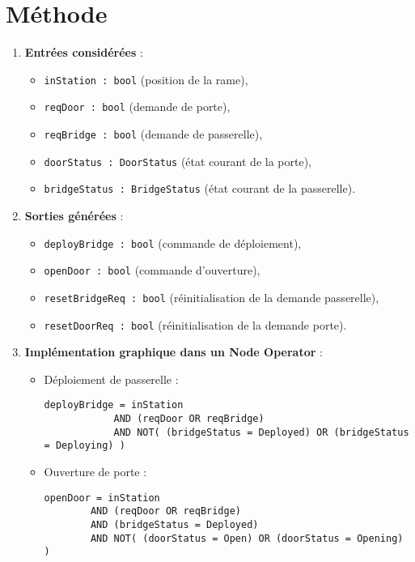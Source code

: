 \documentclass[11pt,a4paper]{report}
\begin{document}
\section*{Méthode}
\begin{enumerate}
  \item \textbf{Entrées considérées} :
  \begin{itemize}
    \item \texttt{inStation : bool} (position de la rame),
    \item \texttt{reqDoor : bool} (demande de porte),
    \item \texttt{reqBridge : bool} (demande de passerelle),
    \item \texttt{doorStatus : DoorStatus} (état courant de la porte),
    \item \texttt{bridgeStatus : BridgeStatus} (état courant de la passerelle).
  \end{itemize}

  \item \textbf{Sorties générées} :
  \begin{itemize}
    \item \texttt{deployBridge : bool} (commande de déploiement),
    \item \texttt{openDoor : bool} (commande d’ouverture),
    \item \texttt{resetBridgeReq : bool} (réinitialisation de la demande passerelle),
    \item \texttt{resetDoorReq : bool} (réinitialisation de la demande porte).
  \end{itemize}

  \item \textbf{Implémentation graphique dans un Node Operator} :
  \begin{itemize}
    \item Déploiement de passerelle :
\begin{lstlisting}
deployBridge = inStation
            AND (reqDoor OR reqBridge)
            AND NOT( (bridgeStatus = Deployed) OR (bridgeStatus = Deploying) )
\end{lstlisting}

    \item Ouverture de porte :
\begin{lstlisting}
openDoor = inStation
        AND (reqDoor OR reqBridge)
        AND (bridgeStatus = Deployed)
        AND NOT( (doorStatus = Open) OR (doorStatus = Opening) )
\end{lstlisting}


\end{itemize}
\end{enumerate}
\end{document}
